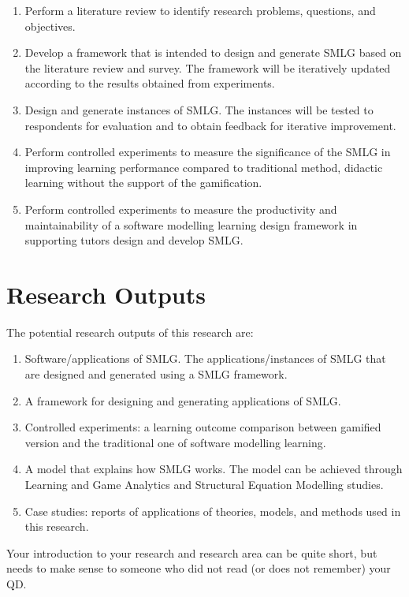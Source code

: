 \documentclass[12pt, a4paper]{report}
\begin{document}
\begin{enumerate}
\item Perform a literature review to identify research problems, questions, and objectives. 
\item Develop a framework that is intended to design and generate SMLG based on the literature review and survey. The framework will be iteratively updated according to the results obtained from experiments. 
\item Design and generate instances of SMLG. The instances will be tested to respondents for evaluation and to obtain feedback for iterative improvement. 
\item Perform controlled experiments to measure the significance of the SMLG in improving learning performance compared to traditional method, didactic learning without the support of the gamification.
\item Perform controlled experiments to measure the productivity and maintainability of a software modelling learning design framework in supporting tutors design and develop SMLG. 
\end{enumerate}

\section{Research Outputs}
The potential research outputs of this research are:
\begin{enumerate}
\item Software/applications of SMLG. The applications/instances of SMLG that are designed and generated using a SMLG framework. 
\item A framework for designing and generating applications of SMLG.
\item Controlled experiments: a learning outcome comparison between gamified version and the traditional one of software modelling learning.
\item A model that explains how SMLG works. The model can be achieved through Learning and Game Analytics and Structural Equation Modelling studies.
\item Case studies: reports of applications of theories, models, and methods used in this research.
\end{enumerate}



Your introduction to your research and research area can be quite short, but needs to make sense to someone who did not read (or does not remember) your QD.  
\end{document}
